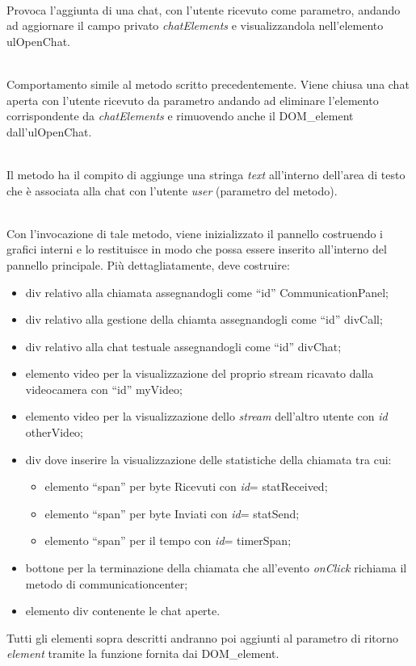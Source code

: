 \begin{description}
\item{}\\
Provoca l'aggiunta di una chat, con l'utente ricevuto come parametro, andando ad aggiornare il campo privato \textit{chatElements} e visualizzandola nell'elemento ulOpenChat.
	
\item{}\\
Comportamento simile al metodo scritto precedentemente. Viene chiusa una chat aperta con l'utente ricevuto da parametro andando ad eliminare l'elemento corrispondente da \textit{chatElements} e rimuovendo anche il DOM\_element dall'ulOpenChat.

\item{}\\
Il metodo ha il compito di aggiunge una stringa \textit{text} all'interno dell'area di testo che è associata alla chat con l'utente \textit{user} (parametro del metodo).

\item{}\\
Con l'invocazione di tale metodo, viene inizializzato il pannello costruendo i  grafici interni e lo restituisce in modo che possa essere inserito all'interno del pannello principale. Più dettagliatamente, deve costruire:
\begin{itemize}
\item div relativo alla chiamata assegnandogli come ``id'' CommunicationPanel;
\item div relativo alla gestione della chiamta assegnandogli come ``id'' divCall;
\item div relativo alla chat testuale assegnandogli come ``id'' divChat;
\item elemento video per la visualizzazione del proprio stream ricavato dalla videocamera con ``id'' myVideo;
\item elemento video per la visualizzazione dello \textit{stream} dell'altro utente con \textit{id} otherVideo;
\item div dove inserire la visualizzazione delle statistiche della chiamata tra cui:
\begin{itemize}
\item elemento ``span'' per byte Ricevuti con \textit{id}= statReceived;
\item elemento ``span'' per byte Inviati con \textit{id}= statSend;
\item elemento ``span'' per il tempo con \textit{id}= timerSpan;
\end{itemize}
\item bottone per la terminazione della chiamata che all'evento \textit{onClick} richiama il metodo  di communicationcenter;
\item elemento div contenente le chat aperte.
\end{itemize}
Tutti gli elementi sopra descritti andranno poi aggiunti al parametro di ritorno \textit{element} tramite la funzione  fornita dai DOM\_element.


\end{description}
